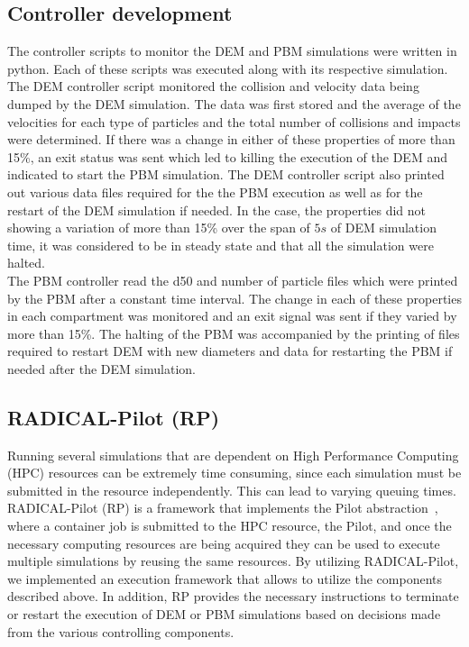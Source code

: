 \documentclass[fleqn,twoside,10pt]{article}
\begin{document}
\subsection{Controller development}
The controller scripts to monitor the DEM and PBM simulations were written in python. Each of these 
scripts was executed along with its respective simulation. The DEM controller script monitored the 
collision and velocity data being dumped by the DEM simulation. The data was first stored and the 
average of the velocities for each type of particles and the total number of collisions and impacts 
were determined. If there was a change in either of these properties of more 
than 15\%, an exit 
status was sent which led to killing the execution of the DEM and indicated to start the PBM 
simulation. The DEM controller script also printed out various data files required for the the PBM 
execution as well as for the restart of the DEM simulation if needed. In the case, the properties did  
not showing a variation of more than 15\% over the span of $5s$ of DEM simulation time, it was 
considered to be in steady state and that all the simulation were halted.\\
The PBM controller read the d50 and number of particle files which were printed by the PBM after a 
constant time interval. The change in each of these properties in each compartment was monitored 
and an exit signal was sent if they varied by more than 15\%. The halting of the PBM was accompanied 
by the printing of files required to restart DEM with new diameters and data for restarting the PBM 
if needed after the DEM simulation.  

\subsection{RADICAL-Pilot (RP)}
Running several simulations that are dependent on High Performance Computing (HPC) resources can 
be extremely time consuming, since each simulation must be submitted in the resource independently.
This can lead to varying queuing times. RADICAL-Pilot (RP) is a framework that implements the Pilot 
abstraction~\citep{pstar12}, where a container job is submitted to the HPC 
resource, the Pilot,
and once the necessary computing resources are being acquired they can be used to execute multiple
simulations by reusing the same resources. By utilizing RADICAL-Pilot, we implemented an execution
framework that allows to utilize the components described above. In addition, RP provides the necessary
instructions to terminate or restart the execution of DEM or PBM simulations based on decisions
made from the various controlling components.
\end{document}
